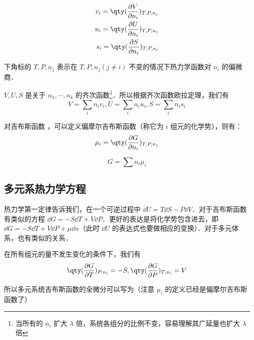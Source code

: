 \begin{equation}
\begin{aligned}
v_i=\qty(\frac{\partial V}{\partial n_i})_{T,P,n_j}\\
u_i=\qty(\frac{\partial U}{\partial n_i})_{T,P,u_j}\\
s_i=\qty(\frac{\partial S}{\partial n_i})_{T,P,s_j}
\end{aligned}
\end{equation}

下角标的 $T,P,n_j$ 表示在 $T,P,n_j(j\neq i)$ 不变的情况下热力学函数对 $n_i$ 的偏微商．

$V,U,S$ 是关于 $n_1,\cdots,n_k$ 的齐次函数\footnote{当所有的 $n_i$ 扩大 $\lambda$ 倍，系统各组分的比例不变，容易理解其广延量也扩大 $\lambda$ 倍}．所以根据齐次函数欧拉定理，我们有
\begin{equation}
V=\sum_i n_iv_i,U=\sum_i n_iu_i,S=\sum_i n_is_i
\end{equation}

对吉布斯函数 ，可以定义偏摩尔吉布斯函数（称它为 $i$ 组元的化学势），则有：
\begin{equation}
\mu_i=\qty(\frac{\partial G}{\partial n_i})_{T,P,n_j}
\end{equation}

\begin{equation}\label{mulTh_eq2}
G=\sum n_i \mu_i
\end{equation}

\subsection{多元系热力学方程}
热力学第一定律告诉我们，在一个可逆过程中 $\dd U=T\dd S-P\dd V$．对于吉布斯函数有类似的方程 $\dd G=-S\dd T+V\dd P$．更好的表达是将化学势包含进去，即 $\dd G=-S\dd T+V\dd P+\mu\dd n$（此时 $\dd U$ 的表达式也要做相应的变换）．对于多元体系，也有类似的关系．

在所有组元的量不发生变化的条件下，我们有
\begin{equation}
\qty(\frac{\partial G}{\partial T})_{P,n_i}=-S,\qty(\frac{\partial G}{\partial P})_{T,n_i}=V
\end{equation}

所以多元系统吉布斯函数的全微分可以写为（注意 $\mu_i$ 的定义已经是偏摩尔吉布斯函数了）

